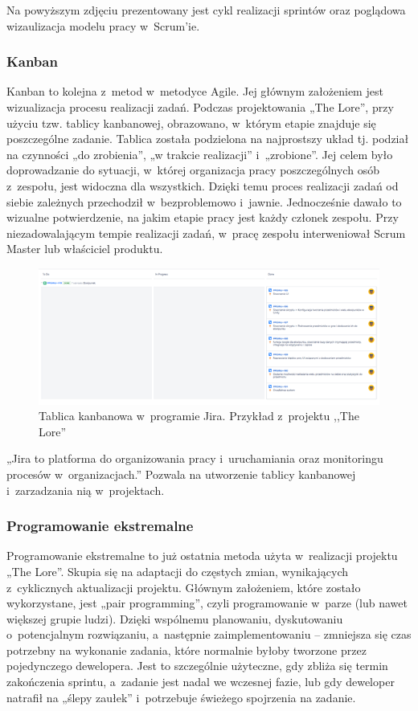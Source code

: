 \documentclass[oneside,polski,logo]{amuthesis}
\begin{document}
Na powyższym zdjęciu prezentowany jest cykl realizacji sprintów oraz poglądowa wizaulizacja modelu pracy w~Scrum'ie.

\subsubsection{Kanban}
Kanban to kolejna z~metod w~metodyce Agile. Jej głównym założeniem jest wizualizacja procesu realizacji zadań. Podczas projektowania „The Lore”, przy użyciu tzw. tablicy kanbanowej, obrazowano, w~którym etapie znajduje się poszczególne zadanie. Tablica została podzielona na najprostszy układ tj. podział na czynności „do zrobienia”, „w trakcie realizacji” i~„zrobione”. Jej celem było doprowadzanie do sytuacji, w~której organizacja pracy poszczególnych osób z~zespołu, jest widoczna dla wszystkich. Dzięki temu proces realizacji zadań od siebie zależnych przechodził w~bezproblemowo i~jawnie. Jednocześnie dawało to wizualne potwierdzenie, na jakim etapie pracy jest każdy członek zespołu. Przy niezadowalającym tempie realizacji zadań, w~pracę zespołu interweniował Scrum Master lub właściciel produktu. \cite{kanban}
\newpage
\begin{figure}[h]
	\centering
	\includegraphics[width=13cm]{images/hyps/jira.png}
	\caption{Tablica kanbanowa w~programie Jira. Przykład z~projektu ,,The Lore''}
\end{figure}

„Jira to platforma do organizowania pracy i~uruchamiania oraz monitoringu procesów w~organizacjach.”  \cite{jira} Pozwala na utworzenie tablicy kanbanowej i~zarzadzania nią w~projektach. 

\subsubsection{Programowanie ekstremalne}
Programowanie ekstremalne to już ostatnia metoda użyta w~realizacji projektu „The Lore”. Skupia się na adaptacji do częstych zmian, wynikających z~cyklicznych aktualizacji projektu. Głównym założeniem, które zostało wykorzystane, jest „pair programming”, czyli programowanie w~parze (lub nawet większej grupie ludzi). Dzięki wspólnemu planowaniu, dyskutowaniu o~potencjalnym rozwiązaniu, a~następnie zaimplementowaniu – zmniejsza się czas potrzebny na wykonanie zadania, które normalnie byłoby tworzone przez pojedynczego dewelopera. Jest to szczególnie użyteczne, gdy zbliża się termin zakończenia sprintu, a~zadanie jest nadal we wczesnej fazie, lub gdy deweloper natrafił na „ślepy zaułek” i~potrzebuje świeżego spojrzenia na zadanie.
\end{document}
